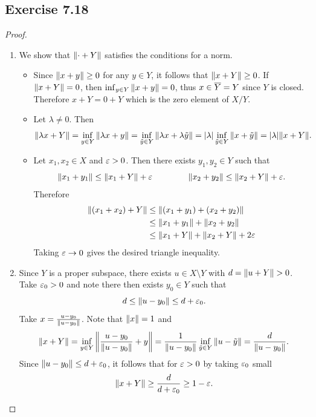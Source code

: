 \documentclass[hw_all.tex]{subfiles}
\begin{document}
\subsection{Exercise 7.18}
\begin{proof}
    \begin{enumerate}
        \item 
            We show that $\norm{\cdot + Y}$ satisfies the conditions for a norm.
            \begin{itemize}
                \item
                    Since $\norm{x + y} \geq 0$ for any $y \in Y$, it follows that $\norm{x + Y} \geq 0$. If $\norm{x + Y} = 0$, then $\inf_{y \in Y} \norm{x + y} = 0$, thus $x \in \overline{Y} = Y$ since $Y$ is closed. Therefore $x + Y = 0 + Y$ which is the zero element of $X / Y$.

                \item 
                    Let $\lambda \neq 0$. Then
                    \[
                        \norm{\lambda x + Y} = \inf_{y \in Y} \norm{\lambda x + y} = \inf_{\tilde{y} \in Y} \norm{\lambda x + \lambda \tilde{y}} = |\lambda| \inf_{\tilde{y} \in Y} \norm{x + \tilde{y}} = |\lambda| \norm{x + Y}
                    .\]

                \item 
                    Let $x_1, x_2 \in X$ and $\varepsilon > 0$. Then there exists $y_1, y_2 \in Y$ such that
                    \[
                        \norm{x_1 + y_1} \leq \norm{x_1 + Y} + \varepsilon \hspace{1.5cm} \norm{x_2 + y_2} \leq \norm{x_2 + Y} + \varepsilon
                    .\]
                    Therefore
                    \begin{align*}
                        \norm{(x_1 + x_2) + Y} &\leq \norm{(x_1 + y_1) + (x_2 + y_2)} \\
                        &\leq \norm{x_1 + y_1} + \norm{x_2 + y_2} \\
                        &\leq \norm{x_1 + Y} + \norm{x_2 + Y} + 2\varepsilon
                    \end{align*}
                    Taking $\varepsilon \to 0$ gives the desired triangle inequality.
            \end{itemize}

        \item 
            Since $Y$ is a proper subspace, there exists $u \in X \setminus Y$ with $d = \norm{u + Y} > 0$. Take $\varepsilon_0 > 0$ and note there then exists $y_0 \in Y$ such that
            \[
                d \leq \norm{u - y_0} \leq d + \varepsilon_0
            .\]
            Take $x = \frac{u - y_0}{\norm{u - y_0}}$. Note that $\norm{x} = 1$ and
            \[
                \norm{x + Y} = \inf_{y \in Y} \norm{\frac{u - y_0}{\norm{u - y_0}} + y} = \frac{1}{\norm{u - y_0}} \inf_{\tilde{y} \in Y} \norm{u - \tilde{y}} = \frac{d}{\norm{u - y_0}}
            .\]
            Since $\norm{u - y_0} \leq d + \varepsilon_0$, it follows that for $\varepsilon > 0$ by taking $\varepsilon_0$ small 
            \[
                \norm{x + Y} \geq \frac{d}{d+\varepsilon_0} \geq 1 - \varepsilon
            .\]


\end{enumerate}
\end{proof}
\end{document}
